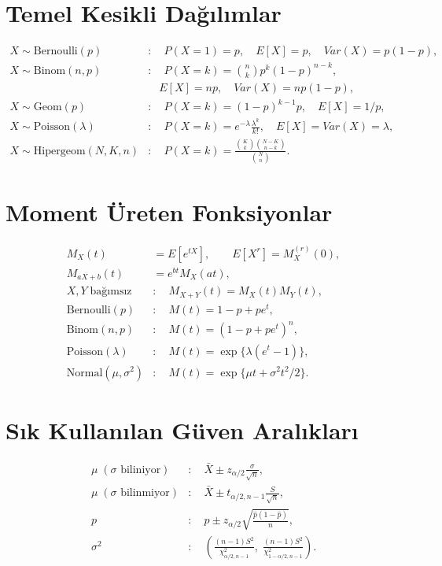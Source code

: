 \section{Temel Kesikli Dağılımlar}
\begin{align*}
X\sim\mathrm{Bernoulli}(p) &: \quad P(X=1)=p, \quad E[X]=p, \quad Var(X)=p(1-p), \\
X\sim\mathrm{Binom}(n,p) &: \quad P(X=k)=\binom{n}{k}p^k(1-p)^{n-k}, \\
&\quad E[X]=np, \quad Var(X)=np(1-p), \\
X\sim\mathrm{Geom}(p) &: \quad P(X=k)=(1-p)^{k-1}p, \quad E[X]=1/p, \\
X\sim\mathrm{Poisson}(\lambda) &: \quad P(X=k)=e^{-\lambda}\frac{\lambda^k}{k!}, \quad E[X]=Var(X)=\lambda, \\
X\sim\mathrm{Hipergeom}(N,K,n) &: \quad P(X=k)=\frac{\binom{K}{k}\binom{N-K}{n-k}}{\binom{N}{n}}.
\end{align*}

\section{Moment Üreten Fonksiyonlar}
\begin{align*}
M_X(t) &= E[e^{tX}], \qquad E[X^r]=M_X^{(r)}(0), \\
M_{aX+b}(t) &= e^{bt}M_X(at), \\
X,Y\; \text{bağımsız} &: \quad M_{X+Y}(t)=M_X(t)M_Y(t), \\
\mathrm{Bernoulli}(p) &: \quad M(t)=1-p+pe^t, \\
\mathrm{Binom}(n,p) &: \quad M(t)=(1-p+pe^t)^n, \\
\mathrm{Poisson}(\lambda) &: \quad M(t)=\exp\{\lambda(e^t-1)\}, \\
\mathrm{Normal}(\mu,\sigma^2) &: \quad M(t)=\exp\{\mu t+\sigma^2t^2/2\}.
\end{align*}

\section{Sık Kullanılan Güven Aralıkları}
\begin{align*}
\mu\; (\sigma \text{ biliniyor}) &: \quad \bar{X} \pm z_{\alpha/2}\frac{\sigma}{\sqrt{n}}, \\
\mu\; (\sigma \text{ bilinmiyor}) &: \quad \bar{X} \pm t_{\alpha/2,n-1}\frac{S}{\sqrt{n}}, \\
p &: \quad \hat{p} \pm z_{\alpha/2}\sqrt{\frac{\hat{p}(1-\hat{p})}{n}}, \\
\sigma^2 &: \quad \left(\frac{(n-1)S^2}{\chi^2_{\alpha/2,n-1}},\; \frac{(n-1)S^2}{\chi^2_{1-\alpha/2,n-1}}\right).
\end{align*}

